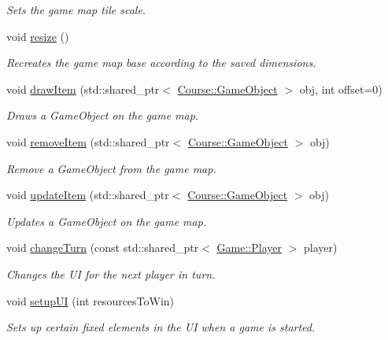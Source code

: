 \begin{DoxyCompactItemize}
\begin{DoxyCompactList}\small\item\em Sets the game map tile scale. \end{DoxyCompactList}\item 
void \hyperlink{classMapWindow_a9eebe13b89eacd419ed5c250a9fc1d2e}{resize} ()
\begin{DoxyCompactList}\small\item\em Recreates the game map base according to the saved dimensions. \end{DoxyCompactList}\item 
void \hyperlink{classMapWindow_a84951fe90f52cd94b73fdc7b0a4e4899}{draw\-Item} (std\-::shared\-\_\-ptr$<$ \hyperlink{classCourse_1_1GameObject}{Course\-::\-Game\-Object} $>$ obj, int offset=0)
\begin{DoxyCompactList}\small\item\em Draws a Game\-Object on the game map. \end{DoxyCompactList}\item 
void \hyperlink{classMapWindow_a88384cf195d4cec6e4779d2f6b83b675}{remove\-Item} (std\-::shared\-\_\-ptr$<$ \hyperlink{classCourse_1_1GameObject}{Course\-::\-Game\-Object} $>$ obj)
\begin{DoxyCompactList}\small\item\em Remove a Game\-Object from the game map. \end{DoxyCompactList}\item 
void \hyperlink{classMapWindow_a40b4e18c08d80bafcf006fafe16d75c2}{update\-Item} (std\-::shared\-\_\-ptr$<$ \hyperlink{classCourse_1_1GameObject}{Course\-::\-Game\-Object} $>$ obj)
\begin{DoxyCompactList}\small\item\em Updates a Game\-Object on the game map. \end{DoxyCompactList}\item 
void \hyperlink{classMapWindow_a0076d3d2fa36a376b2f1a242f9c58fbd}{change\-Turn} (const std\-::shared\-\_\-ptr$<$ \hyperlink{classGame_1_1Player}{Game\-::\-Player} $>$ player)
\begin{DoxyCompactList}\small\item\em Changes the U\-I for the next player in turn. \end{DoxyCompactList}\item 
void \hyperlink{classMapWindow_aa0ab33facccac2bdfafcc68468725f55}{setup\-U\-I} (int resources\-To\-Win)
\begin{DoxyCompactList}\small\item\em Sets up certain fixed elements in the U\-I when a game is started. \end{DoxyCompactList}\end{DoxyCompactItemize}
